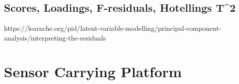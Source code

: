 \begin{figure}[H]
  \begin{minipage}{\wd\FigBox}
    \centering\usebox{\FigBox}
  \end{minipage}\hspace*{\FigHSkip}
  \label{head}
\end{figure}

\subsection{Scores, Loadings, F-residuals, Hotellings T^2 }
https://learnche.org/pid/latent-variable-modelling/principal-component-analysis/interpreting-the-residuals

\vspace{1.3cm}
\section{Sensor Carrying Platform}

